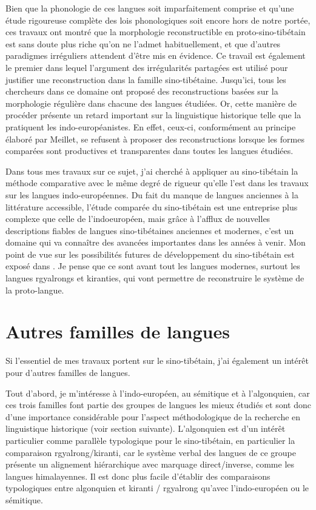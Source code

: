 \documentclass[oldfontcommands,oneside,a4paper,11pt]{memoir}
\begin{document}
Bien que la phonologie de ces langues soit imparfaitement comprise et qu’une étude rigoureuse complète des lois phonologiques soit encore hors de notre portée, ces travaux ont montré que la morphologie reconstructible en proto-sino-tibétain est sans doute plus riche qu’on ne l’admet habituellement, et que d’autres paradigmes irréguliers attendent d’être mis en évidence. Ce travail est également le premier dans lequel l’argument des irrégularités partagées est utilisé pour justifier une reconstruction dans la famille sino-tibétaine. Jusqu’ici, tous les chercheurs dans ce domaine ont proposé des reconstructions basées sur la morphologie régulière dans chacune des langues étudiées. Or, cette manière de procéder présente un retard important sur la linguistique historique telle que la pratiquent les indo-européanistes. En effet, ceux-ci, conformément au principe élaboré par Meillet, se refusent à proposer des reconstructions lorsque les formes comparées sont productives et transparentes dans toutes les langues étudiées. 


	Dans tous mes travaux sur ce sujet, j’ai cherché à appliquer au sino-tibétain la méthode comparative avec le même degré de rigueur qu’elle l’est dans les travaux sur les langues indo-européennes. Du fait du manque de langues anciennes à la littérature accessible, l’étude comparée du sino-tibétain est une entreprise plus complexe que celle de l’indoeuropéen, mais grâce à l’afflux de nouvelles descriptions fiables de langues sino-tibétaines anciennes et modernes, c’est un domaine qui va connaître des avancées importantes dans les années à venir. Mon point de vue sur les possibilités futures de développement du sino-tibétain est exposé dans \citet{jacques2012genetic}. Je pense que ce sont avant tout les langues modernes, surtout les langues rgyalrongs et kiranties, qui vont permettre de reconstruire le système de la proto-langue. 
	
\chapter{Autres familles de langues}
Si l'essentiel de mes travaux portent sur le sino-tibétain, j'ai également un intérêt pour d'autres familles de langues. 

Tout d'abord, je m'intéresse à l'indo-européen, au sémitique et à l'algonquien, car ces trois familles font partie des groupes de langues les mieux étudiés et sont donc d'une importance considérable pour l'aspect méthodologique de la recherche en linguistique historique (voir section suivante). L'algonquien est d'un intérêt particulier comme parallèle typologique pour le sino-tibétain, en particulier la comparaison rgyalrong/kiranti, car le système verbal des langues de ce groupe présente un alignement hiérarchique avec marquage direct/inverse, comme les langues himalayennes. Il est donc plus facile d'établir des comparaisons typologiques entre algonquien et kiranti / rgyalrong qu'avec l'indo-européen ou le sémitique. 
\end{document}

